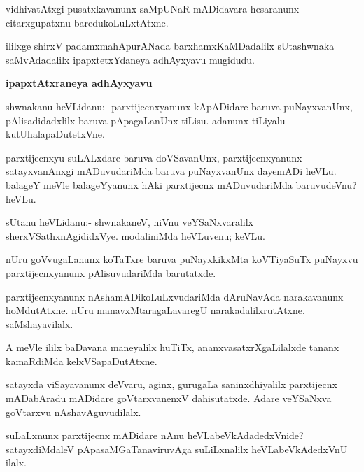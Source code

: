 \begin{mng}
vidhivatAtxgi pusatxkavanunx saMpUNaR mADidavara hesaranunx citarxgupatxnu baredukoLuLxtAtxne.
\end{mng}
ililxge shirxV padamxmahApurANada barxhamxKaMDadalilx sUtashwnaka saMvAdadalilx ipapxtetxYdaneya adhAyxyavu mugidudu.

\begin{center}
\textbf{\large ipapxtAtxraneya adhAyxyavu}
\end{center}

\begin{mng}
shwnakanu heVLidanu:- parxtijecnxyanunx kApADidare baruva puNayxvanUnx, pAlisadidadxlilx baruva pApagaLanUnx tiLisu. adanunx tiLiyalu kutUhalapaDutetxVne.
\end{mng}

\begin{mng}
parxtijecnxyu suLALxdare baruva doVSavanUnx, parxtijecnxyanunx satayxvanAnxgi mADuvudariMda baruva puNayxvanUnx dayemADi heVLu. balageY meVle balageYyanunx hAki parxtijecnx mADuvudariMda baruvudeVnu? heVLu.
\end{mng}

\begin{mng}
sUtanu heVLidanu:- shwnakaneV, niVnu veYSaNxvaralilx sherxVSathxnAgididxVye. modaliniMda heVLuvenu; keVLu.
\end{mng}

\begin{mng}
nUru goVvugaLanunx koTaTxre baruva puNayxkikxMta koVTiyaSuTx puNayxvu parxtijecnxyanunx pAlisuvudariMda barutatxde.
\end{mng}

\begin{mng}
parxtijecnxyanunx nAshamADikoLuLxvudariMda dAruNavAda narakavanunx hoMdutAtxne. nUru manavxMtaragaLavaregU narakadalilxrutAtxne. saMshayavilalx.
\end{mng}

\begin{mng}
A meVle ililx baDavana maneyalilx huTiTx, ananxvasatxrXgaLilalxde tananx kamaRdiMda kelxVSapaDutAtxne.
\end{mng}

\begin{mng}
satayxda viSayavanunx deVvaru, aginx, gurugaLa saninxdhiyalilx parxtijecnx mADabAradu mADidare goVtarxvanenxV dahisutatxde. Adare veYSaNxva goVtarxvu nAshavAguvudilalx.
\end{mng}

\begin{mng}
suLaLxnunx parxtijecnx mADidare nAnu heVLabeVkAdadedxVnide? satayxdiMdaleV pApasaMGaTanaviruvAga suLiLxnalilx heVLabeVkAdedxVnU ilalx.
\end{mng}

